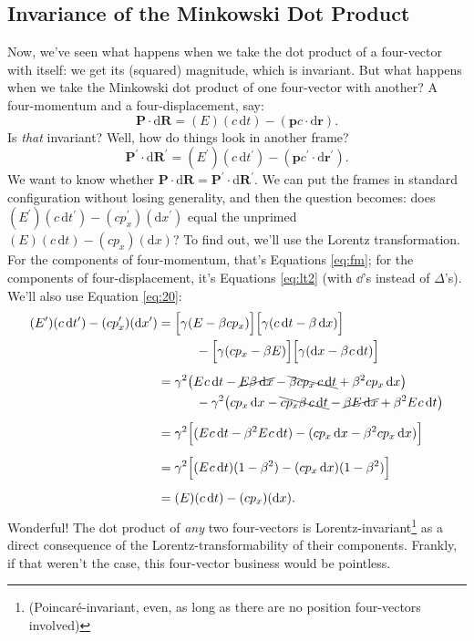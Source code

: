 \documentclass[12pt]{article}
\renewcommand{\vv}[1]{\mathbf{#1}}
\newcommand{\dd}[1]{\mathrm{d}#1}
\begin{document}
\subsection{Invariance of the Minkowski Dot Product}

Now, we've seen what happens when we take the dot product of a four-vector with itself: we get its (squared) magnitude, which is invariant. But what happens when we take the Minkowski dot product of one four-vector with another? A four-momentum and a four-displacement, say:
\begin{equation*}
\vv P \cdot \dd \vv R = (E)(c \, \dd t) - (\vv p c \cdot \dd \vv r) .
\end{equation*}
Is \emph{that} invariant? Well, how do things look in another frame?
\begin{equation*}
\vv P^\prime \cdot \dd \vv R^\prime = (E^\prime)(c \, \dd t^\prime) - (\vv p c ^\prime \cdot \dd \vv r ^\prime) .
\end{equation*}
We want to know whether $\vv P \cdot \dd \vv R = \vv P^\prime \cdot \dd \vv R^\prime$. We can put the frames in standard configuration without losing generality, and then the question becomes: does $(E^\prime)(c \, \dd t^\prime) - (cp_x^\prime)(\dd x^\prime)$ equal the unprimed $(E)(c \, \dd t) - (cp_x)(\dd x)$? To find out, we'll use the Lorentz transformation. For the components of four-momentum, that's Equations \ref{eq:fm}; for the components of four-displacement, it's Equations \ref{eq:lt2} (with $\dd$'s instead of $\Delta$'s). We'll also use Equation \ref{eq:20}:
\begin{equation*}
\begin{split}
(E^\prime)(c \, \dd t^\prime) - (cp_x^\prime)(\dd x^\prime)&=\Bigl[ \gamma(E-\beta cp_x) \Bigr] \Bigl[ \gamma(c \, \dd t - \beta \, \dd x) \Bigr]\\
&\quad \quad \quad - \Bigl[ \gamma(cp_x - \beta E) \Bigr] \Bigl[ \gamma(\dd x - \beta \mkern1mu c \, \dd t) \Bigr]\\[5pt]
&=\gamma^2 \bigl( E \mkern1mu c \, \dd t - \cancel{E \beta \, \dd x} - \bcancel{\beta c p_x \, c \, \dd t} + \beta^2 c p_x \, \dd x \bigr) \\
&\quad \quad \quad - \gamma^2 \bigl( cp_x \, \dd x - \bcancel{c p_x \beta \, c \, \dd t} - \cancel{\beta E \, \dd x} + \beta^2 E \mkern1mu c \, \dd t \bigr) \\[5pt]
&=\gamma^2 \Bigl[ (E \mkern1mu c \, \dd t - \beta^2 E \mkern1mu c \, \dd t) - (cp_x \, \dd x - \beta^2 cp_x \, \dd x) \Bigr]\\[5pt]
&=\gamma^2 \Bigl[ (E \mkern1mu c \, \dd t)(1-\beta^2) - (cp_x \, \dd x)(1-\beta^2) \Bigr]\\[5pt]
&=(E)(c \, \dd t) - (cp_x) (\dd x).
\end{split}
\end{equation*}
Wonderful! The dot product of \emph{any} two four-vectors is Lorentz-invariant\footnote{(Poincar\'e-invariant, even, as long as there are no position four-vectors involved)} as a direct consequence of the Lorentz-transformability of their components. Frankly, if that weren't the case, this four-vector business would be pointless.
\end{document}
